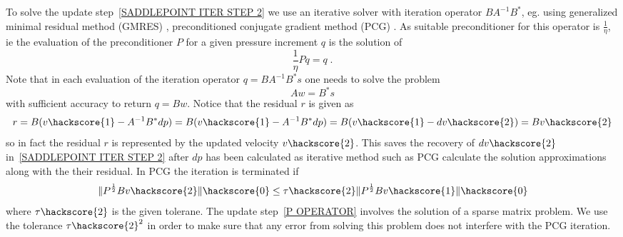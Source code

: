 To solve the update step~\ref{SADDLEPOINT ITER STEP 2} we use an iterative solver with iteration 
operator $B A^{-1} B^{*}$, eg. using generalized minimal residual method (GMRES) , preconditioned conjugate gradient method (PCG) . As suitable preconditioner  for this operator is $\frac{1}{\eta}$, ie 
the evaluation of the preconditioner $P$ for a given pressure increment $q$ is the solution of
\begin{equation} \label{P PREC}
\frac{1}{\eta} Pq = q \; . 
\end{equation}
Note that in each evaluation of the iteration operator $q=B A^{-1} B^{*} s$ one needs to solve
the problem
\begin{equation} \label{P OPERATOR}
A w = B^{*} s 
\end{equation}
with sufficient accuracy to return $q=Bw$. Notice that the residual $r$ is given as
\begin{equation} \label{STOKES RES }
 r= B (v\hackscore{1} -  A^{-1} B^{*} dp) =  B (v\hackscore{1} - A^{-1} B^{*} dp) = B (v\hackscore{1}-dv\hackscore{2}) = B v\hackscore{2}
\end{equation}
so in fact the residual $r$ is represented by the updated velocity $v\hackscore{2}$. This saves the recovery of 
$dv\hackscore{2}$ in~\ref{SADDLEPOINT ITER STEP 2} after $dp$ has been calculated as iterative method such as PCG calculate the solution approximations along with the their residual. In PCG the iteration is terminated if
\begin{equation} \label{P OPERATOR}
\| P^{\frac{1}{2}}B v\hackscore{2} \|\hackscore{0} \le \tau\hackscore{2} \| P^{\frac{1}{2}}B v\hackscore{1} \|\hackscore{0}
\end{equation}
where $\tau\hackscore{2}$ is the given tolerane. The update step~\ref{P OPERATOR} involves the 
solution of a sparse matrix problem. We use the tolerance $\tau\hackscore{2}^2$ in order to make sure that any
error from solving this problem does not interfere with the PCG iteration.



